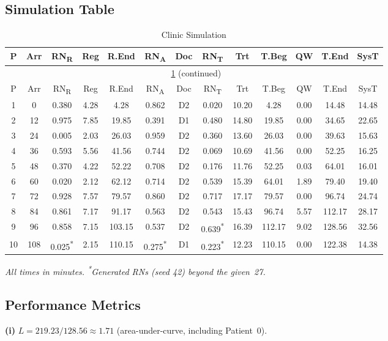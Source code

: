 \documentclass[12pt,a4paper]{article}
\begin{document}
\subsection{Simulation Table}
{\footnotesize
\begin{longtable}{*{13}{c}}
\caption{Clinic Simulation}\label{tab:q2} \\
\toprule
P & Arr & RN\textsubscript{R} & Reg & R.End & RN\textsubscript{A} & Doc & RN\textsubscript{T} & Trt & T.Beg & QW & T.End & SysT \\
\midrule
\endfirsthead
\multicolumn{13}{c}{\tablename\ \ref{tab:q2} (continued)} \\
\toprule
P & Arr & RN\textsubscript{R} & Reg & R.End & RN\textsubscript{A} & Doc & RN\textsubscript{T} & Trt & T.Beg & QW & T.End & SysT \\
\midrule
\endhead
\bottomrule
\endfoot

1  & 0   & 0.380 & 4.28 & 4.28  & 0.862 & D2 & 0.020 & 10.20 & 4.28  & 0.00 & 14.48 & 14.48 \\
2  & 12  & 0.975 & 7.85 & 19.85 & 0.391 & D1 & 0.480 & 14.80 & 19.85 & 0.00 & 34.65 & 22.65 \\
3  & 24  & 0.005 & 2.03 & 26.03 & 0.959 & D2 & 0.360 & 13.60 & 26.03 & 0.00 & 39.63 & 15.63 \\
4  & 36  & 0.593 & 5.56 & 41.56 & 0.744 & D2 & 0.069 & 10.69 & 41.56 & 0.00 & 52.25 & 16.25 \\
5  & 48  & 0.370 & 4.22 & 52.22 & 0.708 & D2 & 0.176 & 11.76 & 52.25 & 0.03 & 64.01 & 16.01 \\
6  & 60  & 0.020 & 2.12 & 62.12 & 0.714 & D2 & 0.539 & 15.39 & 64.01 & 1.89 & 79.40 & 19.40 \\
7  & 72  & 0.928 & 7.57 & 79.57 & 0.860 & D2 & 0.717 & 17.17 & 79.57 & 0.00 & 96.74 & 24.74 \\
8  & 84  & 0.861 & 7.17 & 91.17 & 0.563 & D2 & 0.543 & 15.43 & 96.74 & 5.57 & 112.17 & 28.17 \\
9  & 96  & 0.858 & 7.15 & 103.15 & 0.537 & D2 & 0.639\textsuperscript{*} & 16.39 & 112.17 & 9.02 & 128.56 & 32.56 \\
10 & 108 & 0.025\textsuperscript{*} & 2.15 & 110.15 & 0.275\textsuperscript{*} & D1 & 0.223\textsuperscript{*} & 12.23 & 110.15 & 0.00 & 122.38 & 14.38 \\
\end{longtable}
}

\textit{All times in minutes. \textsuperscript{*}Generated RNs (seed 42) beyond the given~27.}

\subsection{Performance Metrics}
\textbf{(i)} $L = 219.23 / 128.56 \approx \boxed{1.71}$ (area-under-curve, including Patient~0).
\end{document}
